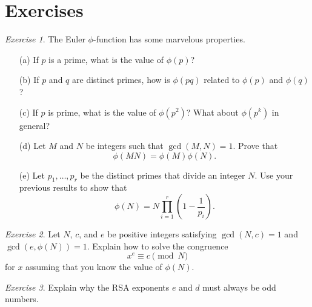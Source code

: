 \documentclass{article}
\theoremstyle{definition}
\theoremstyle{remark}
\newtheorem{exercise}{Exercise}
\newcommand{\ZZ}{\mathbb{Z}}
\begin{document}
\section{Exercises}

    \begin{exercise}
        The Euler \(\phi\)-function has some marvelous properties.
        \begin{enumerate}
            \item[(a)] If \(p\) is a prime, what is the value of \(\phi(p)\)?
            \item[(b)] If \(p\) and \(q\) are distinct primes, how is \(\phi(pq)\) related to \(\phi(p)\) and \(\phi(q)\)?
            \item[(c)] If \(p\) is prime, what is the value of \(\phi(p^2)\)?
            What about \(\phi(p^k)\) in general?
            \item[(d)] Let \(M\) and \(N\) be integers such that \(\gcd(M,N)=1\).
            Prove that
            \[\phi(MN) = \phi(M)\phi(N).\]
            \item[(e)] Let \(p_1,\ldots,p_r\) be the distinct primes that divide an integer \(N\). 
            Use your previous results to show that 
            \[\phi(N) = N\prod_{i=1}^r\left(1-\frac{1}{p_i}\right).\]
        \end{enumerate}
    \end{exercise}
    \iffalse
    Solution:
    Most of these computations are straightforward.
    \fi

    \begin{exercise}
        Let \(N\), \(c\), and \(e\) be positive integers satisfying \(\gcd(N,c)=1\) and \(\gcd(e,\phi(N))=1\).
        Explain how to solve the congruence
        \[x^e \equiv c\pmod{N}\]
        for \(x\) assuming that you know the value of \(\phi(N)\).
    \end{exercise}
    \iffalse
    Solution:
    By Bezout's lemma there exists \(a,b\) such that \(ae+b\phi(N)=1\).
    Now,
    \[x=x^{ae+b\phi(N)}\equiv \left(x^e\right)^a\left(x^{\phi(N)}\right)^b\equiv c^a\pmod{N}\]
    by Euler's theorem.
    \fi

    \begin{exercise}
        Explain why the RSA exponents \(e\) and \(d\) must always be odd numbers.
    \end{exercise}
    \iffalse
    Solution:
    By definition, \(\gcd(e,(p-1)(q-1))=1\).
    Since \((p-1)(q-1)\) is even, \(e\) must be odd.
    Also, the equation
    \[1 = ed + k(p-1)(q-1)\]
    holds for some \(k\in\ZZ\).
    Since \((p-1)(q-1)\) is even and \(e\) is odd, \(d\) cannot be even (otherwise the sum on the right would be even).
    \fi
\end{document}
